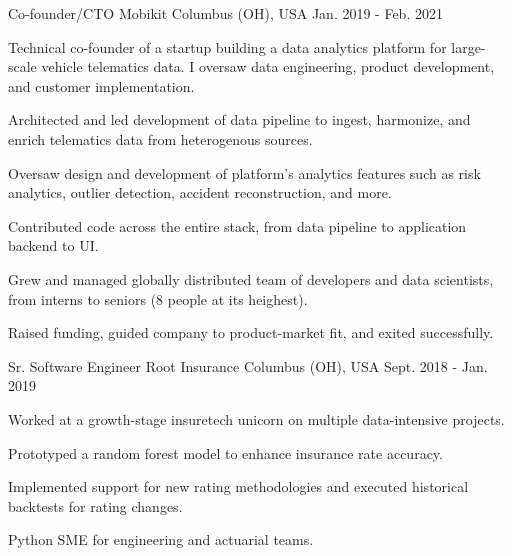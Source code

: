 \begin{cventries}
  \cventry
    {Co-founder/CTO} %
    {Mobikit} %
    {Columbus (OH), USA} %
    {Jan. 2019 - Feb. 2021} %
    {
      Technical co-founder of a startup building a data analytics platform for large-scale vehicle telematics data. I oversaw data engineering, product development, and customer implementation.
      \vspace{5.0mm}
      \begin{cvitems} %
        \item {Architected and led development of data pipeline to ingest, harmonize, and enrich telematics data from heterogenous sources.}
        \item {Oversaw design and development of platform's analytics features such as risk analytics, outlier detection, accident reconstruction, and more.}
        \item {Contributed code across the entire stack, from data pipeline to application backend to UI.}
        \item {Grew and managed globally distributed team of developers and data scientists, from interns to seniors (8 people at its heighest).}
        \item {Raised funding, guided company to product-market fit, and exited successfully.}
      \end{cvitems}
    }

  \cventry
    {Sr. Software Engineer} %
    {Root Insurance} %
    {Columbus (OH), USA} %
    {Sept. 2018 - Jan. 2019} %
    {
      Worked at a growth-stage insuretech unicorn on multiple data-intensive projects.
      \vspace{5.0mm}
      \begin{cvitems} %
        \item {Prototyped a random forest model to enhance insurance rate accuracy.}
        \item {Implemented support for new rating methodologies and executed historical backtests for rating changes.}
        \item {Python SME for engineering and actuarial teams.}
      \end{cvitems}
    }


\end{cventries}
